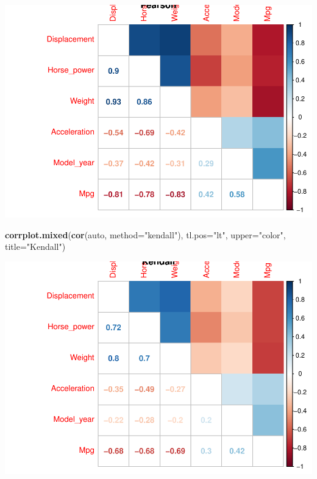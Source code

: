 \documentclass[
]{article}
\newenvironment{Shaded}{\begin{snugshade}}{\end{snugshade}}
\newcommand{\DataTypeTok}[1]{\textcolor[rgb]{0.13,0.29,0.53}{#1}}
\newcommand{\KeywordTok}[1]{\textcolor[rgb]{0.13,0.29,0.53}{\textbf{#1}}}
\newcommand{\NormalTok}[1]{#1}
\newcommand{\StringTok}[1]{\textcolor[rgb]{0.31,0.60,0.02}{#1}}
\begin{document}
\begin{center}\includegraphics{Regresion_files/figure-latex/unnamed-chunk-3-1} \end{center}

\begin{Shaded}
\begin{Highlighting}[]
\KeywordTok{corrplot.mixed}\NormalTok{(}\KeywordTok{cor}\NormalTok{(auto, }\DataTypeTok{method=}\StringTok{"kendall"}\NormalTok{), }\DataTypeTok{tl.pos=}\StringTok{"lt"}\NormalTok{, }\DataTypeTok{upper=}\StringTok{"color"}\NormalTok{, }\DataTypeTok{title=}\StringTok{"Kendall"}\NormalTok{)}
\end{Highlighting}
\end{Shaded}

\begin{center}\includegraphics{Regresion_files/figure-latex/unnamed-chunk-3-2} \end{center}
\end{document}
